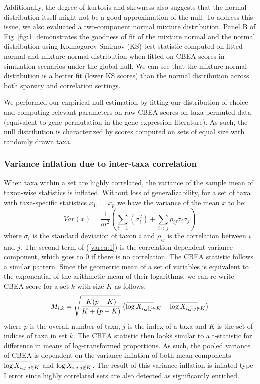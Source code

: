 \documentclass[10pt,letterpaper]{article}
\newcommand{\overbar}[1]{\mkern 2mu\overline{\mkern-2mu#1\mkern-20mu}\mkern 20mu}
\begin{document}
Additionally, the degree of kurtosis and skewness also suggests that the normal distribution itself might not be a good approximation of the null. To address this issue, we also evaluated a two-component normal mixture distribution. Panel B of Fig~\ref{fig:1} demonstrates the goodness of fit of the mixture normal and the normal distribution using Kolmogorov-Smirnov (KS) test statistic computed on fitted normal and mixture normal distribution when fitted on CBEA scores in simulation scenarios under the global null. We can see that the mixture normal distribution is a better fit (lower KS scores) than the normal distribution across both sparsity and correlation settings. 

We performed our empirical null estimation by fitting our distribution of choice and computing relevant parameters on raw CBEA scores on taxa-permuted data (equivalent to gene permutation in the gene expression literature). As such, the null distribution is characterized by scores computed on sets of equal size with randomly drawn taxa. 

\subsubsection*{Variance inflation due to inter-taxa correlation}  
When taxa within a set are highly correlated, the variance of the sample mean of taxon-wise statistics is inflated. Without loss of generalizability, for a set of taxa with taxa-specific statistics $x_1, ..., x_p$ we have the variance of the mean $\bar{x}$ to be:  
\begin{equation} \label{vareq:1}
    Var(\bar{x}) = \frac{1}{m^2}\left(\sum_{i = 1}(\sigma_i^2) + \sum_{i < j}\rho_{ij}\sigma_i\sigma_j\right)
\end{equation}
where $\sigma_i$ is the standard deviation of taxon $i$ and $\rho_{ij}$ is the correlation between $i$ and $j$. The second term of (\ref{vareq:1}) is the correlation dependent variance component, which goes to 0 if there is no correlation. The CBEA statistic follows a similar pattern. Since the geometric mean of a set of variables is equivalent to the exponential of the arithmetic mean of their logarithms, we can re-write CBEA score for a set $k$ with size $K$ as follows:  
\begin{equation}\label{vareq:2}
    M_{i,k} = \sqrt{\frac{K(p - K)}{K + (p - K)}} \left( \overbar{\log{X_{i,j|j \in K}}} - \overbar{\log{X_{i,j|j \notin K}}} \right)   
\end{equation}
where $p$ is the overall number of taxa, $j$ is the index of a taxa and $K$ is the set of indices of taxa in set $k$. The CBEA statistic then looks similar to a t-statistic for difference in means of log-transformed proportions. As such, the pooled variance of CBEA is dependent on the variance inflation of both mean components $\overbar{\log{X_{i,j|j \in K}}}$ and $\overbar{\log{X_{i,j|j \notin K}}}$. The result of this variance inflation is inflated type I error since highly correlated sets are also detected as significantly enriched. 
\end{document}
